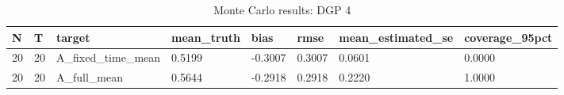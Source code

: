 \begin{table}[!htbp]
\centering
\caption{Monte Carlo results: DGP 4}
\label{tab:mc-dgp4}
\begin{tabular}{llllllll}
\toprule
N & T & target & mean\_truth & bias & rmse & mean\_estimated\_se & coverage\_95pct \\
\midrule
20 & 20 & A\_fixed\_time\_mean & 0.5199 & -0.3007 & 0.3007 & 0.0601 & 0.0000 \\
20 & 20 & A\_full\_mean & 0.5644 & -0.2918 & 0.2918 & 0.2220 & 1.0000 \\
\bottomrule
\end{tabular}
\end{table}
